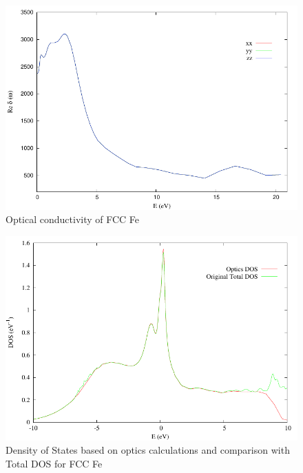 \documentclass[12 pt]{article}
\begin{document}
\begin{enumerate}
  \begin{figure}[ht]
    \centering
    \caption{Optical conductivity of FCC Fe}
    \label{Optics properties of FCC Fe}
    \vspace{2ex}
    \includegraphics[scale=1.3]{gnuplotOptics}
  \end{figure}

  \begin{figure}[ht]
    \centering
    \captionsetup{justification=centering}
    \caption{Density of States based on optics calculations and comparison with Total DOS for FCC Fe}
    \label{Density of States based on optics calculations and comparison with Total DOS for FCC Fe}
    \vspace{2ex}
    \includegraphics[scale=1.3]{gnuplotOptDOS}
  \end{figure}

  \end{enumerate}
\end{document}
